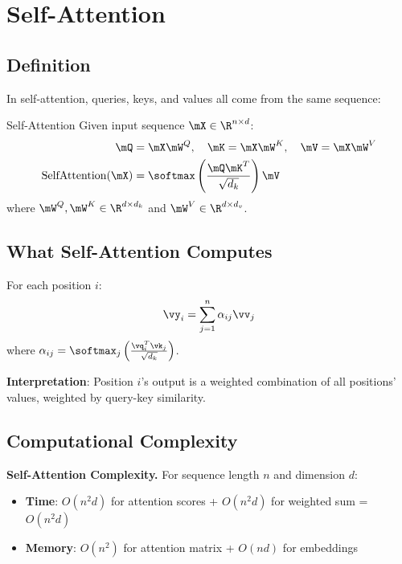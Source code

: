 \section{Self-Attention}
\label{sec:self_attention}

\subsection{Definition}

In self-attention, queries, keys, and values all come from the same sequence:

\begin{mathresult}{Self-Attention}
Given input sequence $\mX \in \R^{n \times d}$:
\begin{align}
\mQ &= \mX \mW^Q, \quad \mK = \mX \mW^K, \quad \mV = \mX \mW^V \\
\text{SelfAttention}(\mX) &= \softmax\left(\frac{\mQ\mK^T}{\sqrt{d_k}}\right)\mV
\end{align}
where $\mW^Q, \mW^K \in \R^{d \times d_k}$ and $\mW^V \in \R^{d \times d_v}$.
\end{mathresult}

\subsection{What Self-Attention Computes}

For each position $i$:
\begin{equation}
\vy_i = \sum_{j=1}^n \alpha_{ij} \vv_j
\end{equation}
where $\alpha_{ij} = \softmax_j\left(\frac{\vq_i^T \vk_j}{\sqrt{d_k}}\right)$.

\textbf{Interpretation}: Position $i$'s output is a weighted combination of all positions' values, weighted by query-key similarity.

\subsection{Computational Complexity}

\textbf{Self-Attention Complexity.}
For sequence length $n$ and dimension $d$:
\begin{itemize}
    \item \textbf{Time}: $O(n^2 d)$ for attention scores + $O(n^2 d)$ for weighted sum = $O(n^2 d)$
    \item \textbf{Memory}: $O(n^2)$ for attention matrix + $O(nd)$ for embeddings
\end{itemize}

